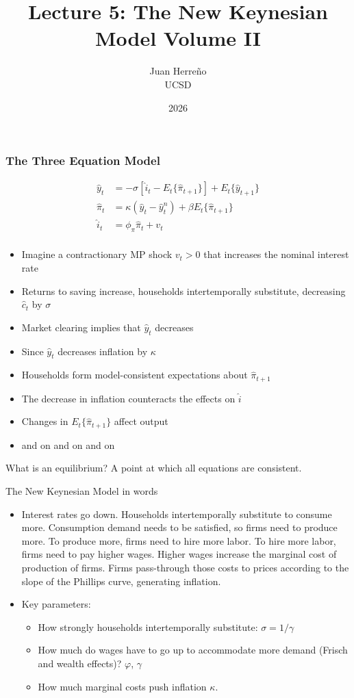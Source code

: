 \documentclass[11pt,aspectratio=169,xcolor={dvipsnames},hyperref={pdftex,pdfpagemode=UseNone,hidelinks,pdfdisplaydoctitle=true},usepdftitle=false]{beamer}
\title{Lecture 5: The New Keynesian Model Volume II}
\author{Juan Herre\~{n}o\\UCSD}
\date{2026}
\begin{document}
\maketitle

\begin{frame}
\frametitle{The Three Equation Model}
	\begin{align*}
		\hat{y}_t &=-\sigma[\hat{i}_t-E_t\{\hat{\pi}_{t+1}\}]+E_t\{\hat{y}_{t+1}\} \\
		\hat{\pi}_t&=\kappa (\hat{y}_t-\hat{y}_t^{n}) +\beta E_t \{\hat{\pi}_{t+1}\} \\
		\hat{i}_t&=\phi_\pi\hat{\pi}_t+v_t \\
	\end{align*}
\begin{itemize}
\item Imagine a contractionary MP shock $v_t >0$ that increases the nominal interest rate
\item Returns to saving increase, households intertemporally substitute, decreasing $\hat{c}_t$ by $\sigma$
\item Market clearing implies that $\hat{y}_t$ decreases
\item Since $\hat{y}_t$ decreases inflation by $\kappa$
\item Households form model-consistent expectations about $ \hat{\pi}_{t+1}$
\item The decrease in inflation counteracts the effects on $\hat{i}$
\item Changes in $E_t\{\hat{\pi}_{t+1}\}$ affect output
\item and on and on and on
\end{itemize}
What is an equilibrium? A point at which all equations are consistent.
\end{frame}


\begin{frame}{The New Keynesian Model in words}
\begin{itemize}
\item Interest rates go down. Households intertemporally substitute to consume more. Consumption demand needs to be satisfied, so firms need to produce more. To produce more, firms need to hire more labor. To hire more labor, firms need to pay higher wages. Higher wages increase the marginal cost of production of firms. Firms pass-through those costs to prices according to the slope of the Phillips curve, generating inflation.
\item Key parameters:
\begin{itemize}
\item How strongly households intertemporally substitute: $\sigma = 1/\gamma$
\item How much do wages have to go up to accommodate more demand (Frisch and wealth effects)? $\varphi$, $\gamma$
\item How much marginal costs push inflation $\kappa$.
\end{itemize}
\end{itemize}
\end{frame}
\end{document}
